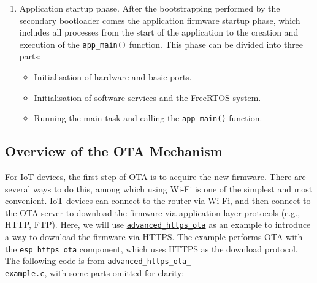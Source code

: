 \documentclass[a4paper,12pt,openany]{book}
\begin{document}
\begin{enumerate}[label=(\arabic*)]
\begin{itemize}[leftmargin=1em]
    \end{itemize}
    \item Application startup phase. After the bootstrapping performed by the secondary bootloader comes the application firmware startup phase, which includes all processes from the start of the application to the creation and execution of the \verb|app_main()| function. This phase can be divided into three parts:
    \begin{itemize}[leftmargin=1em]
        \item Initialisation of hardware and basic ports.
        \item Initialisation of software services and the FreeRTOS system.
        \item Running the main task and calling the \verb|app_main()| function.
    \end{itemize}
\end{enumerate}

\subsection{Overview of the OTA Mechanism}
For IoT devices, the first step of OTA is to acquire the new firmware. There are several ways to do this, among which using Wi-Fi is one of the simplest and most convenient. IoT devices can connect to the router via Wi-Fi, and then connect to the OTA server to download the firmware via application layer protocols (e.g., HTTP, FTP). Here, we will use \href{https://github.com/espressif/esp-idf/tree/master/examples/system/ota/advanced_https_ota}{\texttt{advanced\_https\_ota}} as an example to introduce a way to download the firmware via HTTPS. The example performs OTA with the \verb|esp_https_ota| component, which uses HTTPS as the download protocol. The following code is from \href{https://github.com/espressif/esp-idf/blob/master/examples/system/ota/advanced_https_ota/main/advanced_https_ota_example.c}{\texttt{advanced\_https\_ota\_\\ example.c}}, with some parts omitted for clarity:
\end{document}
